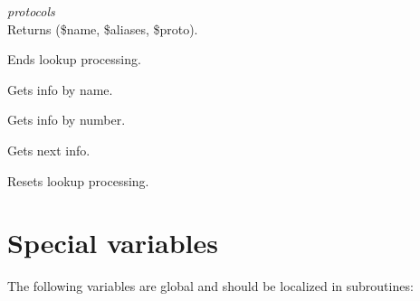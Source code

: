{\vskip6pt\large\sl protocols} \\

Returns (\$name, \$aliases, \$proto).

\begin{enum}{6cm}

Ends lookup processing.

Gets info by name.

Gets info by number.

Gets next info.

Resets lookup processing.

\end{enum}


\section{Special variables} 

The following variables are global and should be localized in subroutines:

